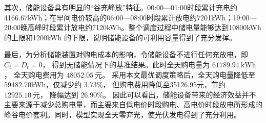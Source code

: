 其次，储能设备具有明显的“谷充峰放”特征。00:00—01:00时段累计充电约4166.67kWh；在早间电价较高的06:00—08:00时段累计放电约7201kWh；19:00—20:00晚高峰时段累计放电约7120kWh。整个调度过程中储电量能够达到10800kWh 的上限和1200kWh 的下限，说明储能设备的可利用容量得到了充分发挥。

最后，为分析储能装置对购电成本的影响，令储能设备不进行任何充放电，即 \(C_t=D_t=0\)， 得到无储能情况下的基准结果。此时全天购电量为 \(61789.94\ \mathrm{kWh}\)， 全天购电费用为 \(48052.05\ \text{元}\)。 采用本文最优调度策略后，全天购电量降低至59482.70kWh，仅减少约 \(3.73\%\)， 但购电费用降低至35126.95元，节约 \(12925.10\ \text{元}\)， 降幅达到 \(\boxed{26.90\%}\)。 因此可以看出，储能设备带来的经济效益并不主要来源于减少总购电量，而主要来自低电价时段购电、高电价时段放电所形成的峰谷电价套利。同时，模型实现全天零弃光，使光伏发电得到了充分利用。
